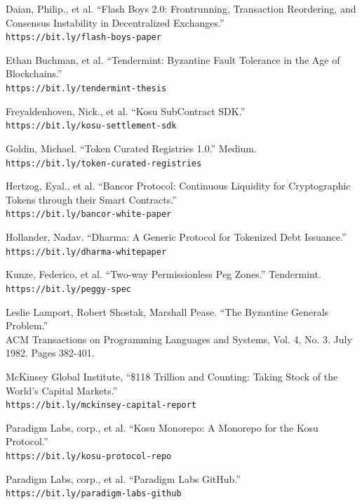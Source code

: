 \documentclass[10pt]{article}
\begin{document}
\begin{thebibliography}{9}
Daian, Philip., et al. ``Flash Boys 2.0: Frontrunning, Transaction Reordering, and Consensus Instability in Decentralized Exchanges.''
\\\texttt{https://bit.ly/flash-boys-paper}

Ethan Buchman, et al. ``Tendermint: Byzantine Fault Tolerance in the Age of Blockchains.''
\\\texttt{https://bit.ly/tendermint-thesis}

Freyaldenhoven, Nick., et al. ``Kosu SubContract SDK.''
\\\texttt{https://bit.ly/kosu-settlement-sdk}

Goldin, Michael. ``Token Curated Registries 1.0.'' Medium.
\\\texttt{https://bit.ly/token-curated-registries}

Hertzog,  Eyal., et al. ``Bancor Protocol: Continuous Liquidity for Cryptographic Tokens through their Smart Contracts.''
\\\texttt{https://bit.ly/bancor-white-paper}

Hollander, Nadav. ``Dharma: A Generic Protocol for Tokenized Debt Issuance.''
\\\texttt{https://bit.ly/dharma-whitepaper}

Kunze, Federico, et al. ``Two-way Permissionless Peg Zones.'' Tendermint.
\\\texttt{https://bit.ly/peggy-spec}

Leslie Lamport, Robert Shostak, Marshall Pease. ``The Byzantine Generals Problem.''
\\ACM Transactions on Programming Languages and Systems, Vol. 4, No. 3. July 1982. Pages 382-401.

McKinsey Global Institute, ``\$118 Trillion and Counting: Taking Stock of the World's Capital Markets.''
\\\texttt{https://bit.ly/mckinsey-capital-report}

Paradigm Labs, corp., et al. ``Kosu Monorepo: A Monorepo for the Kosu Protocol.''
\\\texttt{https://bit.ly/kosu-protocol-repo}

Paradigm Labs, corp., et al. ``Paradigm Labs GitHub.''
\\\texttt{https://bit.ly/paradigm-labs-github}


\end{thebibliography}
\end{document}
